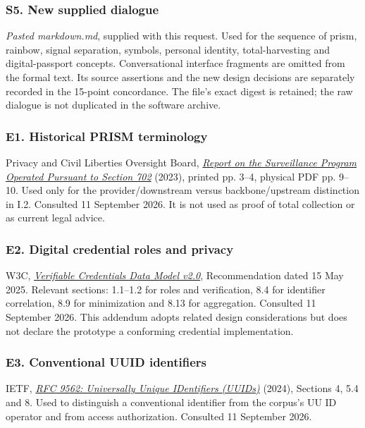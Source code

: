 \documentclass[11pt,a4paper]{article}
\begin{document}
\subsubsection{S5. New supplied dialogue}
\emph{Pasted markdown.md}, supplied with this request. Used for the sequence of prism, rainbow, signal separation, symbols, personal identity, total-harvesting and digital-passport concepts. Conversational interface fragments are omitted from the formal text. Its source assertions and the new design decisions are separately recorded in the 15-point concordance. The file's exact digest is retained; the raw dialogue is not duplicated in the software archive.

\subsubsection{E1. Historical PRISM terminology}
Privacy and Civil Liberties Oversight Board, \href{https://documents.pclob.gov/prod/Documents/OversightReport/054417e4-9d20-427a-9850-862a6f29ac42/2023\%20PCLOB\%20702\%20Report\%20(002).pdf}{\emph{Report on the Surveillance Program Operated Pursuant to Section 702}} (2023), printed pp. 3--4, physical PDF pp. 9--10. Used only for the provider/downstream versus backbone/upstream distinction in I.2. Consulted 11 September 2026. It is not used as proof of total collection or as current legal advice.

\subsubsection{E2. Digital credential roles and privacy}
W3C, \href{https://www.w3.org/TR/2025/REC-vc-data-model-2.0-20250515/}{\emph{Verifiable Credentials Data Model v2.0}}, Recommendation dated 15 May 2025. Relevant sections: 1.1--1.2 for roles and verification, 8.4 for identifier correlation, 8.9 for minimization and 8.13 for aggregation. Consulted 11 September 2026. This addendum adopts related design considerations but does not declare the prototype a conforming credential implementation.

\subsubsection{E3. Conventional UUID identifiers}
IETF, \href{https://www.rfc-editor.org/rfc/rfc9562.html}{\emph{RFC 9562: Universally Unique IDentifiers (UUIDs)}} (2024), Sections 4, 5.4 and 8. Used to distinguish a conventional identifier from the corpus's UU ID operator and from access authorization. Consulted 11 September 2026.
\end{document}
